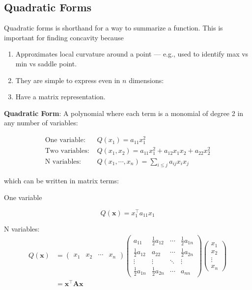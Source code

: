 \documentclass[]{book}
\providecommand{\tightlist}{%
  \setlength{\itemsep}{0pt}\setlength{\parskip}{0pt}}
\theoremstyle{definition}
\theoremstyle{definition}
\theoremstyle{definition}
\theoremstyle{remark}
\begin{document}
\hypertarget{quadratic-forms}{%
\subsection*{Quadratic Forms}\label{quadratic-forms}}

Quadratic forms is shorthand for a way to summarize a function. This is important for finding concavity because

\begin{enumerate}
\def\labelenumi{\arabic{enumi}.}
\tightlist
\item
  Approximates local curvature around a point --- e.g., used to
  identify max vs min vs saddle point.
\item
  They are simple to express even in \(n\) dimensions:
\item
  Have a matrix representation.
\end{enumerate}

\textbf{Quadratic Form}: A polynomial where each term is a monomial
of degree 2 in any number of variables:

\begin{align*}
\text{One variable: }& Q(x_1) = a_{11}x_1^2\\
\text{Two variables: }& Q(x_1,x_2) = a_{11}x_1^2 + a_{12}x_1x_2 + a_{22}x_2^2\\
\text{N variables: }& Q(x_1,\cdots,x_n)=\sum\limits_{i\le j} a_{ij}x_i x_j
\end{align*}

which can be written in matrix terms:

One variable

\[Q(\mathbf{x}) = x_1^\top a_{11} x_1\]

N variables:
\begin{align*}
Q(\mathbf{x}) &=\begin{pmatrix} x_1 & x_2 & \cdots & x_n \end{pmatrix}\begin{pmatrix}
a_{11}&\frac{1}{2}a_{12}&\cdots&\frac{1}{2}a_{1n}\\
\frac{1}{2}a_{12}&a_{22}&\cdots&\frac{1}{2}a_{2n}\\
\vdots&\vdots&\ddots&\vdots\\
\frac{1}{2}a_{1n}&\frac{1}{2}a_{2n}&\cdots&a_{nn}
\end{pmatrix}
\begin{pmatrix} x_1\\x_2\\\vdots\\x_n\end{pmatrix}\\
&= \mathbf{x}^\top\mathbf{Ax}
\end{align*}
\end{document}
